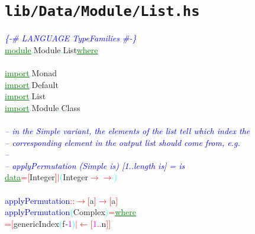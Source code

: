 \section{\texttt{lib/Data/Module/List.hs}}
\label{mod:Data.Module.List}
\textcolor{blue}{{\it{}\{-\# LANGUAGE TypeFamilies \#-\}}}\\\textcolor{green}{\underline{module}}\textcolor{cyan}{.}{\rm{}Module}\textcolor{cyan}{.}{\rm{}List}\hsspace \textcolor{green}{\underline{where}}\\\\\textcolor{green}{\underline{import}}\textcolor{cyan}{.}{\rm{}Monad}\\\textcolor{green}{\underline{import}}\textcolor{cyan}{.}{\rm{}Default}\\\textcolor{green}{\underline{import}}\textcolor{cyan}{.}{\rm{}List}\\\textcolor{green}{\underline{import}}\textcolor{cyan}{.}{\rm{}Module}\textcolor{cyan}{.}{\rm{}Class}\\\\\textcolor{blue}{{\it{}-- in the Simple variant, the elements of the list tell which index the}}\\\textcolor{blue}{{\it{}-- corresponding element in the output list should come from, e.g.}}\\\textcolor{blue}{{\it{}--}}\\\textcolor{blue}{{\it{}-- applyPermutation (Simple is) [1..length is] = is}}\\\textcolor{green}{\underline{data}}\hsspace \textcolor{red}{=}\hsspace \textcolor{red}{[}{\rm{}Integer}\textcolor{red}{]}\hsspace \textcolor{red}{\ensuremath{|}}\hsspace \textcolor{cyan}{(}{\rm{}Integer}\hsspace \textcolor{red}{\ensuremath{\rightarrow}}\hsspace \textcolor{red}{\ensuremath{\rightarrow}}\textcolor{cyan}{)}\\\\\textcolor{blue}{applyPermutation}\hsspace \textcolor{red}{::}\hsspace \textcolor{red}{\ensuremath{\rightarrow}}\hsspace \textcolor{red}{[}{\rm{}a}\textcolor{red}{]}\hsspace \textcolor{red}{\ensuremath{\rightarrow}}\hsspace \textcolor{red}{[}{\rm{}a}\textcolor{red}{]}\\\textcolor{blue}{applyPermutation}\hsspace \textcolor{cyan}{(}{\rm{}Complex}\textcolor{cyan}{)}\hsspace \textcolor{red}{=}\hsspace \textcolor{green}{\underline{where}}\\\hsspace \textcolor{red}{=}\hsspace \textcolor{red}{[}{\rm{}genericIndex}\hsspace \textcolor{cyan}{(}{\rm{}f}\hsspace \textcolor{blue}{{\it{}-}}\hsspace \textcolor{magenta}{1}\textcolor{cyan}{)}\hsspace \textcolor{red}{\ensuremath{|}}\hsspace \textcolor{red}{\ensuremath{\leftarrow}}\hsspace \textcolor{red}{[}\textcolor{magenta}{1}\textcolor{red}{..}{\rm{}n}\textcolor{red}{]}\textcolor{red}{]}\\\hsspace \hsspace 
